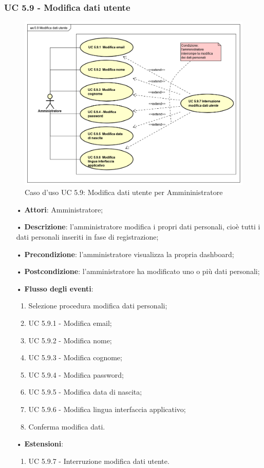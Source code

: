 \subsubsection{UC 5.9 - Modifica dati utente}
\begin{figure}[H]
	\centering
	\includegraphics[width=12cm, keepaspectratio]{img/UC59.png} 
	\caption{Caso d'uso UC 5.9:  Modifica dati utente per Ammininistratore}\label{fig:411}
\end{figure}
\begin{itemize}
	\item[•]\textbf{Attori}: Amministratore;
	\item[•]\textbf{Descrizione}: l'amministratore modifica i propri dati personali, cioè tutti i dati personali inseriti in fase di registrazione;
	\item[•]\textbf{Precondizione}: l'amministratore visualizza la propria dashboard;
	\item[•]\textbf{Postcondizione}: l'amministratore ha modificato uno o più dati personali; 
	\item[•]\textbf{Flusso degli eventi}: 
	\begin{enumerate}
		\item Selezione procedura modifica dati personali;
		\item UC 5.9.1 - Modifica email; 
		\item UC 5.9.2 - Modifica nome;
		\item UC 5.9.3 - Modifica cognome;
		\item UC 5.9.4 - Modifica password;
		\item UC 5.9.5 - Modifica data di nascita;
		\item UC 5.9.6 - Modifica lingua interfaccia applicativo;
		\item Conferma modifica dati.
	\end{enumerate}
	\item[•] \textbf{Estensioni}:	
	\begin{enumerate}
		\item UC 5.9.7 - Interruzione modifica dati utente.
	\end{enumerate}
\end{itemize}
